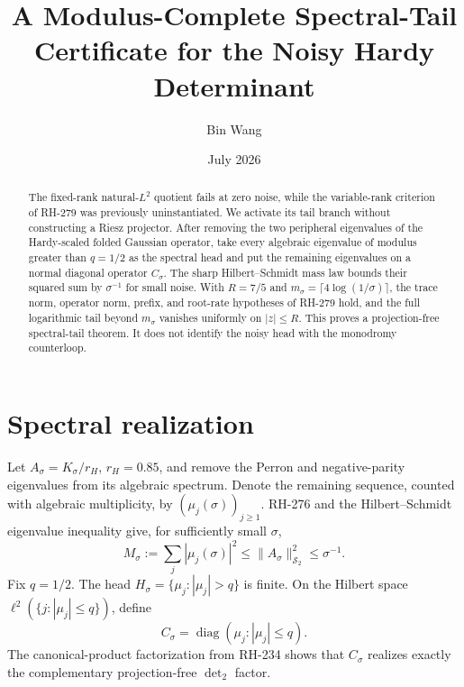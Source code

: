 \documentclass[11pt]{article}
\title{A Modulus-Complete Spectral-Tail Certificate for the Noisy Hardy Determinant}
\author{Bin Wang}\date{July 2026}
\theoremstyle{remark}\newtheorem{remark}[theorem]{Remark}
\newcommand{\Schatten}{\mathcal S}
\begin{document}
\maketitle
\begin{abstract}
The fixed-rank natural-$L^2$ quotient fails at zero noise, while the
variable-rank criterion of RH-279 was previously uninstantiated.  We activate
its tail branch without constructing a Riesz projector.  After removing the
two peripheral eigenvalues of the Hardy-scaled folded Gaussian operator, take
every algebraic eigenvalue of modulus greater than $q=1/2$ as the spectral
head and put the remaining eigenvalues on a normal diagonal operator
$C_\sigma$.  The sharp Hilbert--Schmidt mass law bounds their squared sum by
$\sigma^{-1}$ for small noise.  With $R=7/5$ and
$m_\sigma=\lceil4\log(1/\sigma)\rceil$, the trace norm, operator norm,
prefix, and root-rate hypotheses of RH-279 hold, and the full logarithmic
tail beyond $m_\sigma$ vanishes uniformly on $|z|\le R$.  This proves a
projection-free spectral-tail theorem.  It does not identify the noisy head
with the monodromy counterloop.
\end{abstract}

\section{Spectral realization}
Let $A_\sigma=K_\sigma/r_H$, $r_H=0.85$, and remove the Perron and
negative-parity eigenvalues from its algebraic spectrum.  Denote the
remaining sequence, counted with algebraic multiplicity, by
$(\mu_j(\sigma))_{j\ge1}$.  RH-276 and the Hilbert--Schmidt eigenvalue
inequality give, for sufficiently small $\sigma$,
\begin{equation}\label{eq:mass}
 M_\sigma:=\sum_j|\mu_j(\sigma)|^2
 \le \|A_\sigma\|_{\Schatten_2}^2\le\sigma^{-1}.
\end{equation}
Fix $q=1/2$.  The head
$H_\sigma=\{\mu_j:|\mu_j|>q\}$ is finite.  On the Hilbert space
$\ell^2(\{j:|\mu_j|\le q\})$, define
\[
 C_\sigma=\operatorname{diag}(\mu_j:|\mu_j|\le q).
\]
The canonical-product factorization from RH-234 shows that $C_\sigma$
realizes exactly the complementary projection-free $\det_2$ factor.
\end{document}
